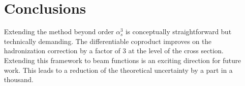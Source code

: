 \section{Conclusions}\label{sec:conclusions}

Extending the method beyond order $\alpha_s^3$ is conceptually
straightforward but technically demanding. The differentiable coproduct
improves on the hadronization correction by a factor of 3 at the level
of the cross section. Extending this framework to beam functions is an
exciting direction for future work. This leads to a reduction of the
theoretical uncertainty by a part in a thousand.

